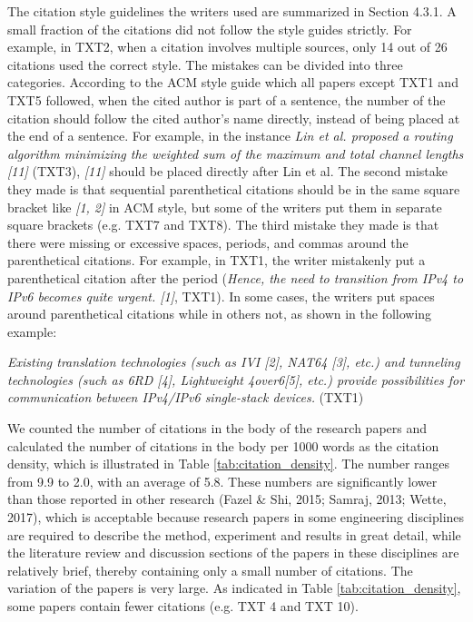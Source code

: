 The citation style guidelines the writers used are summarized in Section 4.3.1. A small fraction of the citations did not follow the style guides strictly. For example, in TXT2, when a citation involves multiple sources, only 14 out of 26 citations used the correct style. The mistakes can be divided into three categories. According to the ACM style guide which all papers except TXT1 and TXT5 followed, when the cited author is part of a sentence, the number of the citation should follow the cited author’s name directly, instead of being placed at the end of a sentence. For example, in the instance \textit{Lin et al. proposed a routing algorithm minimizing the weighted sum of the maximum and total channel lengths [11]} (TXT3), \textit{[11]} should be placed directly after Lin et al. The second mistake they made is that sequential parenthetical citations should be in the same square bracket like \textit{[1, 2]} in ACM style, but some of the writers put them in separate square brackets (e.g. TXT7 and TXT8). The third mistake they made is that there were missing or excessive spaces, periods, and commas around the parenthetical citations. For example, in TXT1, the writer mistakenly put a parenthetical citation after the period (\textit{Hence, the need to transition from IPv4 to IPv6 becomes quite urgent. [1]}, TXT1). In some cases, the writers put spaces around parenthetical citations while in others not, as shown in the following example:

\textit{Existing translation technologies (such as IVI [2], NAT64 [3], etc.) and tunneling technologies (such as 6RD [4], Lightweight 4over6[5], etc.) provide possibilities for communication between IPv4/IPv6 single-stack devices.} (TXT1)

We counted the number of citations in the body of the research papers and calculated the number of citations in the body per 1000 words as the citation density, which is illustrated in Table \ref{tab:citation_density}. The number ranges from 9.9 to 2.0, with an average of 5.8. These numbers are significantly lower than those reported in other research (Fazel \& Shi, 2015; Samraj, 2013; Wette, 2017), which is acceptable because research papers in some engineering disciplines are required to describe the method, experiment and results in great detail, while the literature review and discussion sections of the papers in these disciplines are relatively brief, thereby containing only a small number of citations. The variation of the papers is very large. As indicated in Table \ref{tab:citation_density}, some papers contain fewer citations (e.g. TXT 4 and TXT 10).

